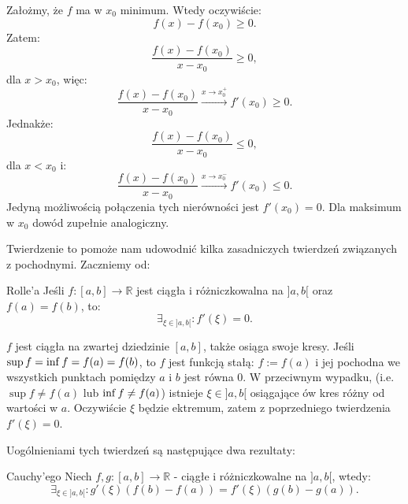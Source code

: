 \documentclass{article}
\numberwithin{defi}{section}
\numberwithin{defi}{section}
\newcommand{\R}{\mathbb{R}}
\renewcommand{\inf}{\mathop{\mathrm{inf}\vphantom{\mathrm{sup}}}}
\renewcommand{\geq}{\geqslant}
\renewcommand{\leq}{\leqslant}
\begin{document}
    \begin{dow}
        Założmy, że $f$ ma w $x_0$ minimum. Wtedy oczywiście: \begin{equation*}
            f(x) - f(x_0) \geq 0. 
        \end{equation*} Zatem: \begin{equation*}
            \frac{f(x) - f(x_0)}{x - x_0} \geq 0,
        \end{equation*} dla $x > x_0$, więc: \begin{equation*}
            \frac{f(x) - f(x_0)}{x - x_0} \xrightarrow{x \to x_0^+} f'(x_0) \geq 0.
        \end{equation*} Jednakże: \begin{equation*}
            \frac{f(x) - f(x_0)}{x - x_0} \leq 0,
        \end{equation*} dla $x < x_0$ i:\begin{equation*}
            \frac{f(x) - f(x_0)}{x - x_0} \xrightarrow{x \to x_0^-} f'(x_0) \leq 0.
        \end{equation*} Jedyną możliwością połączenia tych nierówności jest $f'(x_0) = 0$. Dla maksimum w $x_0$ dowód zupełnie analogiczny.
    \end{dow}


    Twierdzenie to pomoże nam udowodnić kilka zasadniczych twierdzeń związanych z pochodnymi. Zaczniemy od:
    \begin{twier}{Rolle'a}
        Jeśli $f: [a, b] \to \R$ jest ciągła i różniczkowalna na $]a, b[$ oraz $f(a) = f(b)$, to: \begin{equation*}
            \exists_{\xi \in ]a, b[ }: f'(\xi) = 0. 
        \end{equation*}
    \end{twier}

    \begin{dow}
        $f$ jest ciągła na zwartej dziedzinie $[a, b]$, także osiąga swoje kresy. Jeśli $\sup f = \inf f = f(a) = f(b)$, to $f$ jest funkcją stałą: $f := f(a)$ i jej pochodna we wszystkich punktach pomiędzy $a$ i $b$ jest równa 0. W przeciwnym wypadku, (i.e. $\sup f \neq f(a)$ lub $\inf f \neq f(a)$) istnieje $\xi \in ]a, b[$ osiągające ów kres różny od wartości w $a$. Oczywiście $\xi$ będzie ektremum, zatem z poprzedniego twierdzenia $f'(\xi) = 0$. 
    \end{dow}

    Uogólnieniami tych twierdzeń są następujące dwa rezultaty:

    \begin{twier}{Cauchy'ego}
        Niech $f, g: [a, b] \to \R$ - ciągłe i różniczkowalne na $]a, b[$, wtedy:\begin{equation}
            \exists_{\xi \in ]a, b[ }: g'(\xi) (f(b) - f(a)) = f'(\xi) (g(b) - g(a)).
        \end{equation} 
    \end{twier}
\end{document}

